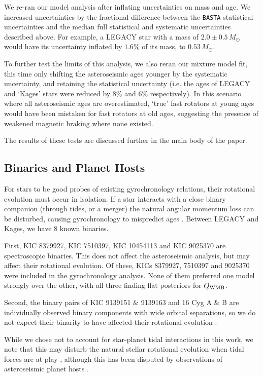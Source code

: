 \documentclass[12pt]{article}
\begin{document}
We re-ran our model analysis after inflating uncertainties on mass and age. We increased uncertainties by the fractional difference between the \texttt{BASTA} statistical uncertainties and the median full statistical and systematic uncertainties described above. For example, a LEGACY star with a mass of $2.0 \pm 0.5\, M_\odot$ would have its uncertainty inflated by $1.6\%$ of its mass, to $0.53\, M_\odot$. 

To further test the limits of this analysis, we also reran our mixture model fit, this time only shifting the asteroseismic ages younger by the systematic uncertainty, and retaining the statistical uncertainty (i.e. the ages of LEGACY and `Kages' stars were reduced by $8\%$ and $6\%$ respectively). In this scenario where all asteroseismic ages are overestimated, `true' fast rotators at young ages would have been mistaken for fast rotators at old ages, suggesting the presence of weakened magnetic braking where none existed. 

The results of these tests are discussed further in the main body of the paper.

\subsection{Binaries and Planet Hosts}
For stars to be good probes of existing gyrochronology relations, their rotational evolution must occur in isolation. If a star interacts with a close binary companion (through tides, or a merger) the natural angular momentum loss can be disturbed, causing gyrochronology to mispredict ages \cite{m_leiner+2019, m_fleming+2019}. Between LEGACY and Kages, we have 8 known binaries. 

First, KIC 8379927, KIC 7510397, KIC 10454113 and KIC 9025370 are spectroscopic binaries. This does not affect the asteroseismic analysis, but may affect their rotational evolution. Of these, KICs 8379927, 7510397 and 9025370 were included in the gyrochronology analysis. None of them preferred one model strongly over the other, with all three finding flat posteriors for $Q_{\rm WMB}$.

Second, the binary pairs of KIC 9139151 \& 9139163 and 16 Cyg A \& B are individually observed binary components with wide orbital separations, so we do not expect their binarity to have affected their rotational evolution \cite{m_halbwachs1986, m_white+2013}. 

While we chose not to account for star-planet tidal interactions in this work, we note that this may disturb the natural stellar rotational evolution when tidal forces are at play \cite{m_maxted+2015,m_gallet+delorme2019, m_benbakoura+2019}, although this has been disputed by observations of asteroseismic planet hosts \cite{m_ceillier+2016}.\\
\end{document}
